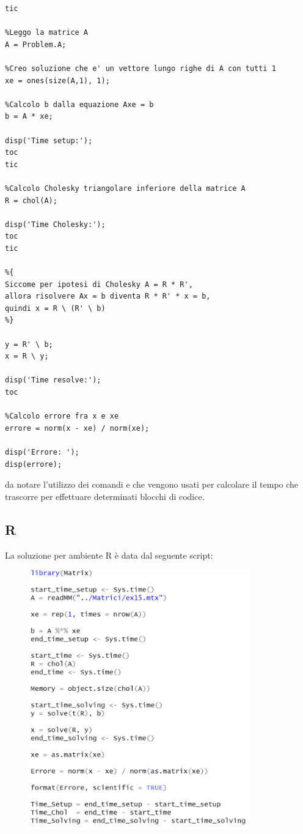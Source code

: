 \documentclass[preprint,12pt]{elsarticle}
\begin{document}
\begin{lstlisting}
tic

%Leggo la matrice A
A = Problem.A;

%Creo soluzione che e' un vettore lungo righe di A con tutti 1
xe = ones(size(A,1), 1);

%Calcolo b dalla equazione Axe = b
b = A * xe;

disp('Time setup:');
toc
tic

%Calcolo Cholesky triangolare inferiore della matrice A 
R = chol(A);

disp('Time Cholesky:');
toc
tic

%{
Siccome per ipotesi di Cholesky A = R * R',
allora risolvere Ax = b diventa R * R' * x = b,
quindi x = R \ (R' \ b)
%}

y = R' \ b;
x = R \ y;

disp('Time resolve:');
toc

%Calcolo errore fra x e xe
errore = norm(x - xe) / norm(xe);

disp('Errore: ');
disp(errore);

\end{lstlisting}

da notare l'utilizzo dei comandi  e  che vengono usati per calcolare il tempo che trascorre per effettuare determinati blocchi di codice.

\subsection{R}

La soluzione per ambiente R è data dal seguente script:
\begin{figure}[h]
	\includegraphics[width=0.85\textwidth]{rcode}
\end{figure}
\end{document}
